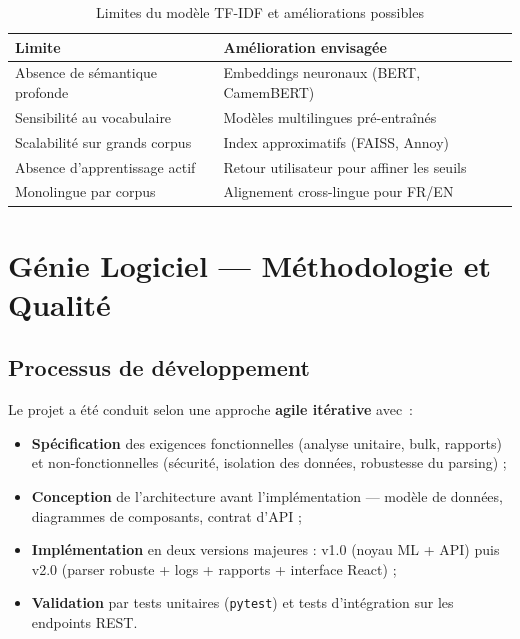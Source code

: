 \documentclass[12pt, a4paper]{article}
\begin{document}
\begin{table}[H]
\centering
\caption{Limites du modèle TF-IDF et améliorations possibles}
\begin{tabularx}{\textwidth}{lX}
\toprule
\rowcolor{tablehead}
\color{white}\textbf{Limite} & \color{white}\textbf{Amélioration envisagée} \\
\midrule
\rowcolor{tablegray}
Absence de sémantique profonde & Embeddings neuronaux (BERT, CamemBERT) \\
Sensibilité au vocabulaire      & Modèles multilingues pré-entraînés \\
\rowcolor{tablegray}
Scalabilité sur grands corpus  & Index approximatifs (FAISS, Annoy) \\
Absence d'apprentissage actif  & Retour utilisateur pour affiner les seuils \\
\rowcolor{tablegray}
Monolingue par corpus           & Alignement cross-lingue pour FR/EN \\
\bottomrule
\end{tabularx}
\end{table}

\section{Génie Logiciel --- Méthodologie et Qualité}

\subsection{Processus de développement}

Le projet a été conduit selon une approche \textbf{agile itérative} avec~:

\begin{itemize}
  \item \textbf{Spécification} des exigences fonctionnelles (analyse unitaire, bulk, rapports) et non-fonctionnelles (sécurité, isolation des données, robustesse du parsing) ;
  \item \textbf{Conception} de l'architecture avant l'implémentation --- modèle de données, diagrammes de composants, contrat d'API ;
  \item \textbf{Implémentation} en deux versions majeures : v1.0 (noyau ML + API) puis v2.0 (parser robuste + logs + rapports + interface React) ;
  \item \textbf{Validation} par tests unitaires (\texttt{pytest}) et tests d'intégration sur les endpoints REST.
\end{itemize}
\end{document}
